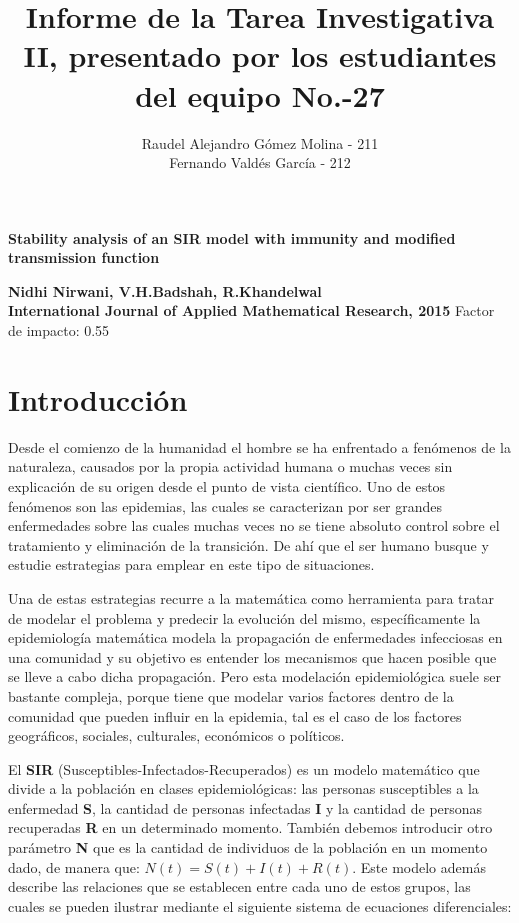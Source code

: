 \documentclass{article}
\title{Informe de la Tarea Investigativa II, presentado por los estudiantes del equipo No.-27}
\author{Raudel Alejandro G\'omez Molina - 211 \\ Fernando Vald\'es Garc\'ia - 212}
\date{}
\begin{document}
    \maketitle

    \begin{center}
        
        \LARGE{\textbf{Stability analysis of an SIR model with immunity and modified transmission function}} \par \bigskip
        \normalsize
        \Large{\textbf{Nidhi Nirwani, V.H.Badshah, R.Khandelwal}}  \\ \bigskip
        \textbf{International Journal of Applied Mathematical Research, 2015}
        Factor de impacto: 0.55 
    \end{center}

    \pagebreak

    \section{Introducción}
    
    Desde el comienzo de la humanidad el hombre se ha enfrentado a fenómenos de la naturaleza, causados por la propia actividad humana o muchas veces sin explicación de su origen desde el punto de vista científico. Uno de estos fenómenos son las epidemias, las cuales se caracterizan por ser grandes enfermedades sobre las cuales muchas veces no se tiene absoluto control sobre el tratamiento y eliminación de la transición. De ahí que el ser humano busque y estudie estrategias para emplear en este tipo de situaciones.
    
    Una de estas estrategias recurre a la matemática como herramienta para tratar de modelar el problema y predecir la evolución del mismo, específicamente la epidemiología matemática modela la propagación de enfermedades infecciosas en una comunidad y su objetivo es entender los mecanismos que hacen posible que se lleve a cabo dicha propagación. Pero esta modelación epidemiológica suele ser bastante compleja, porque tiene que modelar varios factores dentro de la comunidad que pueden influir en la epidemia, tal es el caso de los factores geográficos, sociales, culturales, económicos o políticos.
    
    El \textbf{SIR} (Susceptibles-Infectados-Recuperados) es un modelo matemático que divide a la población en clases epidemiológicas: las personas susceptibles a la enfermedad \textbf{S}, la cantidad de personas infectadas \textbf{I} y la cantidad de personas recuperadas \textbf{R} en un determinado momento. También debemos introducir otro parámetro \textbf{N} que es la cantidad de individuos de la población en un momento dado, de manera que: $N(t)=S(t)+I(t)+R(t)$. Este modelo además describe las relaciones que se establecen entre cada uno de estos grupos, las cuales se pueden ilustrar mediante el siguiente sistema de ecuaciones diferenciales:
       
\end{document}
